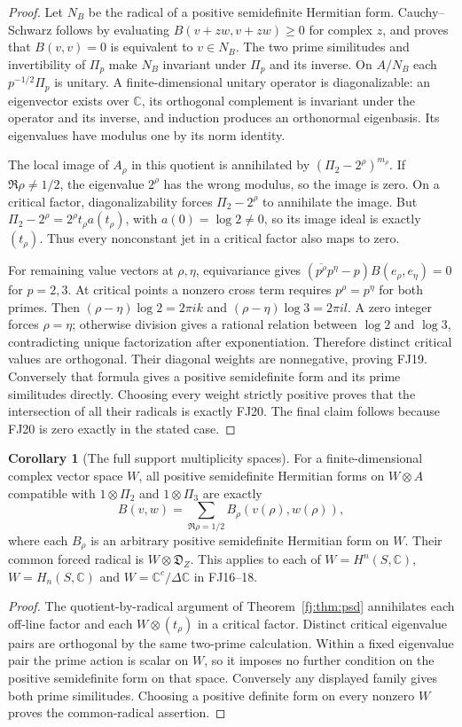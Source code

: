\documentclass[11pt,a4paper]{article}
\theoremstyle{definition}\newtheorem{definition}[theorem]{Definition}
\newcommand{\C}{\mathbb C}\newcommand{\R}{\mathbb R}
\newtheorem{corollary}[theorem]{Corollary}
\begin{document}
\begin{proof}
Let $N_B$ be the radical of a positive semidefinite Hermitian form.
Cauchy--Schwarz follows by evaluating $B(v+zw,v+zw)\ge0$ for complex
$z$, and proves that $B(v,v)=0$ is equivalent to $v\in N_B$.
The two prime similitudes and invertibility of $\Pi_p$ make $N_B$
invariant under $\Pi_p$ and its inverse. On $A/N_B$ each
$p^{-1/2}\Pi_p$ is unitary. A finite-dimensional unitary operator is
diagonalizable: an eigenvector exists over $\C$, its orthogonal
complement is invariant under the operator and its inverse, and
induction produces an orthonormal eigenbasis. Its eigenvalues have
modulus one by its norm identity.

The local image of $A_\rho$ in this quotient is annihilated by
$(\Pi_2-2^\rho)^{m_\rho}$. If $\Re\rho\ne1/2$, the eigenvalue
$2^\rho$ has the wrong modulus, so the image is zero. On a critical
factor, diagonalizability forces $\Pi_2-2^\rho$ to annihilate the
image. But
$\Pi_2-2^\rho=2^\rho t_\rho a(t_\rho)$, with
$a(0)=\log2\ne0$, so its image ideal is exactly $(t_\rho)$.
Thus every nonconstant jet in a critical factor also maps to zero.

For remaining value vectors at $\rho,\eta$, equivariance gives
$(\overline{p^\rho}p^\eta-p)B(e_\rho,e_\eta)=0$ for $p=2,3$.
At critical points a nonzero cross term requires
$p^\rho=p^\eta$ for both primes. Then
$(\rho-\eta)\log2=2\pi ik$ and
$(\rho-\eta)\log3=2\pi il$. A zero integer forces $\rho=\eta$;
otherwise division gives a rational relation between $\log2$ and
$\log3$, contradicting unique factorization after exponentiation.
Therefore distinct critical values are orthogonal. Their diagonal
weights are nonnegative, proving FJ19. Conversely that formula gives
a positive semidefinite form and its prime similitudes directly.
Choosing every weight strictly positive proves that the intersection
of all their radicals is exactly FJ20. The final claim follows because
FJ20 is zero exactly in the stated case.
\end{proof}

\begin{corollary}[The full support multiplicity spaces]
For a finite-dimensional complex vector space $W$, all positive
semidefinite Hermitian forms on $W\otimes A$ compatible with
$1\otimes\Pi_2$ and $1\otimes\Pi_3$ are exactly
\[
 B(v,w)=\sum_{\Re\rho=1/2}B_\rho(v(\rho),w(\rho)),
\]
where each $B_\rho$ is an arbitrary positive semidefinite Hermitian
form on $W$. Their common forced radical is $W\otimes\mathfrak D_Z$.
This applies to each of $W=H^n(S,\C)$,
$W=H_n(S,\C)$ and $W=\C^c/\Delta\C$ in FJ16--18.
\end{corollary}
\begin{proof}
The quotient-by-radical argument of Theorem~\ref{fj:thm:psd} annihilates
each off-line factor and each $W\otimes(t_\rho)$ in a critical factor.
Distinct critical eigenvalue pairs are orthogonal by the same two-prime
calculation. Within a fixed eigenvalue pair the prime action is scalar
on $W$, so it imposes no further condition on the positive semidefinite
form on that space. Conversely any displayed family gives both prime
similitudes. Choosing a positive definite form on every nonzero $W$
proves the common-radical assertion.
\end{proof}
\end{document}
